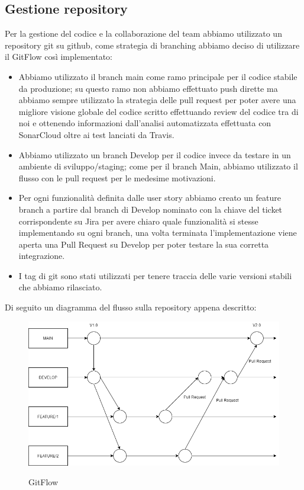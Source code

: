 \documentclass{article}
\begin{document}
\subsection{Gestione repository}
Per la gestione del codice e la collaborazione del team abbiamo utilizzato un repository git su github, come strategia di branching abbiamo deciso di utilizzare il GitFlow così implementato:\\
\begin{itemize}
    \item Abbiamo utilizzato il branch main come ramo principale per il codice stabile da produzione; su questo ramo non abbiamo effettuato push dirette ma abbiamo sempre utilizzato la strategia delle pull request per poter avere una migliore visione globale del codice scritto effettuando review del codice tra di noi e ottenendo informazioni dall’analisi automatizzata effettuata con SonarCloud oltre ai test lanciati da Travis.
    \item Abbiamo utilizzato un branch Develop per il codice invece da testare in un ambiente di sviluppo/staging; come per il branch Main, abbiamo utilizzato il flusso con le pull request per le medesime motivazioni.
    \item Per ogni funzionalità definita dalle user story abbiamo creato un feature branch a partire dal branch di Develop nominato con la chiave del ticket corrispondente su Jira per avere chiaro quale funzionalità si stesse implementando su ogni branch, una volta terminata l’implementazione viene aperta una Pull Request su Develop per poter testare la sua corretta integrazione.\\
    \item I tag di git sono stati utilizzati per tenere traccia delle varie versioni stabili che abbiamo rilasciato.\\
\end{itemize}
Di seguito un diagramma del flusso sulla repository appena descritto:\\
\begin{figure}[h!]
\centering
\includegraphics[scale=0.5]{GitFlow.png}
\label{fig:GitFlow}
\caption{GitFlow}
\end{figure}
\end{document}

